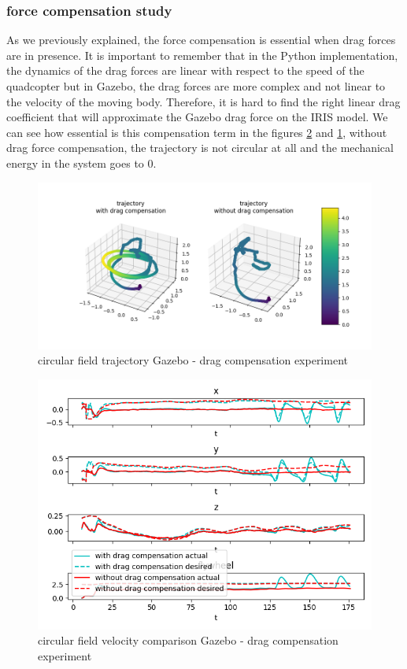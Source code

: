 \subsubsection{force compensation study}
As we previously explained, the force compensation is essential when drag forces are in presence. 
It is important to remember that in the Python implementation, the dynamics of the drag forces are linear with respect to the speed of the quadcopter but in Gazebo, 
the drag forces are more complex and not linear to the velocity of the moving body. Therefore, it is hard to find the right linear drag coefficient that will approximate the Gazebo drag force on the IRIS model.
We can see how essential is this compensation term in the figures \ref{fig:velgazebocircularfcomp} and \ref{fig:trajgazebocircularfcomp}, without drag force compensation, the trajectory is not circular at all and the mechanical energy in the system goes to 0. 
\begin{figure}[h!]
   \centering
   \includegraphics[width=\linewidth]{Images/gazebo_trajectory_fcomp_circular.png}
   \caption{circular field trajectory Gazebo - drag compensation experiment}
   \label{fig:trajgazebocircularfcomp}
\end{figure}
\begin{figure}[h!]
   \centering
   \includegraphics[width=\linewidth]{Images/gazebo_circular_fcomp_V.png}
   \caption{circular field velocity comparison Gazebo - drag compensation experiment}
   \label{fig:velgazebocircularfcomp}
\end{figure}
